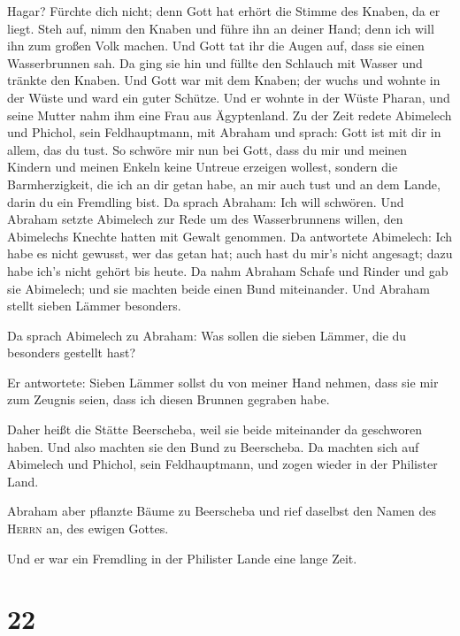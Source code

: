 Hagar? Fürchte dich nicht; denn Gott hat erhört die Stimme des Knaben,
da er liegt.  Steh auf, nimm den Knaben und führe ihn an
deiner Hand; denn ich will ihn zum großen Volk machen. 
Und Gott tat ihr die Augen auf, dass sie einen Wasserbrunnen sah. Da
ging sie hin und füllte den Schlauch mit Wasser und tränkte den Knaben.
 Und Gott war mit dem Knaben; der wuchs und wohnte in der
Wüste und ward ein guter Schütze.  Und er wohnte in der
Wüste Pharan, und seine Mutter nahm ihm eine Frau aus Ägyptenland.
 Zu der Zeit redete Abimelech und Phichol, sein
Feldhauptmann, mit Abraham und sprach: Gott ist mit dir in allem, das du
tust.  So schwöre mir nun bei Gott, dass du mir und
meinen Kindern und meinen Enkeln keine Untreue erzeigen wollest, sondern
die Barmherzigkeit, die ich an dir getan habe, an mir auch tust und an
dem Lande, darin du ein Fremdling bist.  Da sprach
Abraham: Ich will schwören.  Und Abraham setzte Abimelech
zur Rede um des Wasserbrunnens willen, den Abimelechs Knechte hatten mit
Gewalt genommen.  Da antwortete Abimelech: Ich habe es
nicht gewusst, wer das getan hat; auch hast du mir's nicht angesagt;
dazu habe ich's nicht gehört bis heute.  Da nahm Abraham
Schafe und Rinder und gab sie Abimelech; und sie machten beide einen
Bund miteinander.  Und Abraham stellt sieben Lämmer
besonders.

 Da sprach Abimelech zu Abraham: Was sollen die sieben
Lämmer, die du besonders gestellt hast?

 Er antwortete: Sieben Lämmer sollst du von meiner Hand
nehmen, dass sie mir zum Zeugnis seien, dass ich diesen Brunnen gegraben
habe.

 Daher heißt die Stätte Beerscheba, weil sie beide
miteinander da geschworen haben.  Und also machten sie
den Bund zu Beerscheba. Da machten sich auf Abimelech und Phichol, sein
Feldhauptmann, und zogen wieder in der Philister Land.

 Abraham aber pflanzte Bäume zu Beerscheba und rief
daselbst den Namen des \textsc{Herrn} an, des ewigen Gottes.

 Und er war ein Fremdling in der Philister Lande eine
lange Zeit.

\hypertarget{section-21}{%
\section{22}\label{section-21}}

